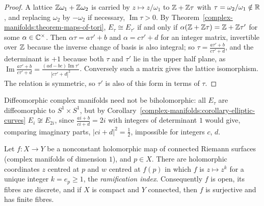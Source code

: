 \begin{proof}
A lattice $\mathbb{Z}\omega_1 + \mathbb{Z}\omega_2$ is carried by $z \mapsto z/\omega_1$ to $\mathbb{Z} + \mathbb{Z}\tau$ with $\tau = \omega_2/\omega_1 \notin \mathbb{R}$, and replacing $\omega_2$ by $-\omega_2$ if necessary, $\operatorname{Im}\tau > 0$. By
Theorem~\ref{complex-manifolds:theorem-maps-of-tori}, $E_\tau \cong E_{\tau'}$ if and only if $\alpha(\mathbb{Z} + \mathbb{Z}\tau) = \mathbb{Z} + \mathbb{Z}\tau'$ for some $\alpha \in \mathbb{C}^\times$. Then $\alpha\tau = a\tau' + b$ and $\alpha = c\tau' + d$ for an integer matrix,
invertible over $\mathbb{Z}$ because the inverse change of basis is also integral; so $\tau = \frac{a\tau' + b}{c\tau' + d}$, and the determinant is $+1$ because both $\tau$ and $\tau'$ lie in the upper half plane, as
$\operatorname{Im}\frac{a\tau' + b}{c\tau' + d} = \frac{(ad - bc)\operatorname{Im}\tau'}{|c\tau' + d|^2}$. Conversely such a matrix gives the lattice isomorphism. The relation is symmetric, so $\tau'$ is also of this form in terms of $\tau$.
\end{proof}

\begin{counterexample}\label{complex-manifolds:counterexample-tori}
Diffeomorphic complex manifolds need not be biholomorphic: all $E_\tau$ are diffeomorphic to $S^1 \times S^1$, but by Corollary~\ref{complex-manifolds:corollary-elliptic-curves} $E_i \not\cong E_{2i}$, since
$\frac{ai + b}{ci + d} = 2i$ with integers of determinant $1$ would give, comparing imaginary parts, $|ci + d|^2 = \frac12$, impossible for integers $c$, $d$.
\end{counterexample}

\begin{proposition}\label{complex-manifolds:proposition-normal-form}
Let $f \colon X \to Y$ be a nonconstant holomorphic map of connected Riemann surfaces (complex manifolds of dimension $1$), and $p \in X$. There are holomorphic coordinates $z$ centred at $p$ and $w$ centred at $f(p)$ in
which $f$ is $z \mapsto z^k$ for a unique integer $k = e_p \geq 1$, the \emph{ramification index}. Consequently $f$ is open, its fibres are discrete, and if $X$ is compact and $Y$ connected, then $f$ is surjective and
has finite fibres.
\end{proposition}

